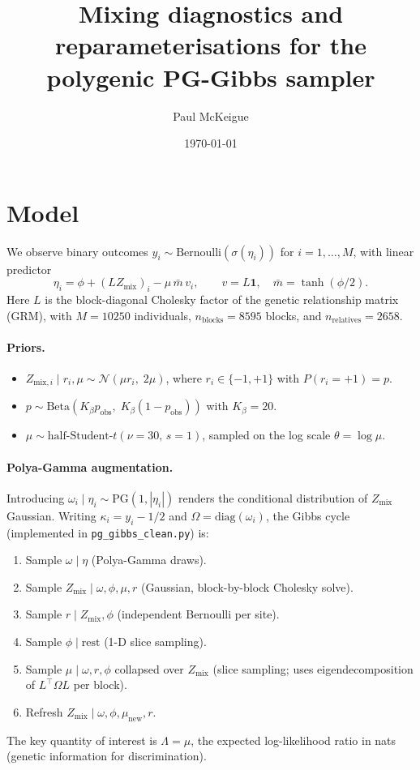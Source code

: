 \documentclass[11pt,a4paper]{article}
\title{Mixing diagnostics and reparameterisations for the polygenic PG-Gibbs sampler}
\author{Paul McKeigue}
\date{\today}
\begin{document}
\maketitle

\section{Model}

We observe binary outcomes $y_i \sim \text{Bernoulli}(\sigma(\eta_i))$ for $i = 1, \ldots, M$, with linear predictor
\begin{equation}
  \eta_i = \phi + (L Z_{\text{mix}})_i - \mu\,\bar{m}\, v_i,
  \qquad v = L\mathbf{1},\quad \bar{m} = \tanh(\phi/2).
\end{equation}
Here $L$ is the block-diagonal Cholesky factor of the genetic relationship matrix (GRM), with $M = 10250$ individuals, $n_{\text{blocks}} = 8595$ blocks, and $n_{\text{relatives}} = 2658$.

\paragraph{Priors.}
\begin{itemize}
  \item $Z_{\text{mix},i} \mid r_i, \mu \sim \mathcal{N}(\mu r_i,\; 2\mu)$, where $r_i \in \{-1, +1\}$ with $P(r_i = +1) = p$.
  \item $p \sim \text{Beta}(K_\beta p_{\text{obs}},\; K_\beta(1 - p_{\text{obs}}))$ with $K_\beta = 20$.
  \item $\mu \sim \text{half-Student-}t(\nu = 30,\, s = 1)$, sampled on the log scale $\theta = \log\mu$.
\end{itemize}

\paragraph{Polya-Gamma augmentation.}
Introducing $\omega_i \mid \eta_i \sim \text{PG}(1, |\eta_i|)$ renders the conditional distribution of $Z_{\text{mix}}$ Gaussian. Writing $\kappa_i = y_i - 1/2$ and $\Omega = \text{diag}(\omega_i)$, the Gibbs cycle (implemented in \texttt{pg\_gibbs\_clean.py}) is:
\begin{enumerate}
  \item Sample $\omega \mid \eta$ (Polya-Gamma draws).
  \item Sample $Z_{\text{mix}} \mid \omega, \phi, \mu, r$ (Gaussian, block-by-block Cholesky solve).
  \item Sample $r \mid Z_{\text{mix}}, \phi$ (independent Bernoulli per site).
  \item Sample $\phi \mid \text{rest}$ (1-D slice sampling).
  \item Sample $\mu \mid \omega, r, \phi$ collapsed over $Z_{\text{mix}}$ (slice sampling; uses eigendecomposition of $L^\top \Omega L$ per block).
  \item Refresh $Z_{\text{mix}} \mid \omega, \phi, \mu_{\text{new}}, r$.
\end{enumerate}
The key quantity of interest is $\Lambda = \mu$, the expected log-likelihood ratio in nats (genetic information for discrimination).
\end{document}

